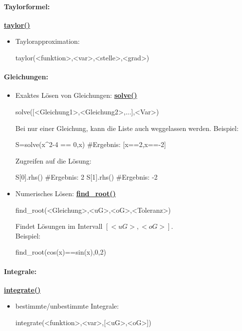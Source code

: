 \documentclass[a4paper,9pt,DIV15,twocolumn]{scrartcl}
\begin{document}
{\paragraph{Taylorformel:} \href{https://sage.math.uni-goettingen.de/doc/static/reference/sage/calculus/functional.html?highlight=diff#sage.calculus.functional.integral}{\textbf{taylor()}}
\begin{itemize}
 \item Taylorapproximation: 

\begin{sageinsmall}
taylor(<funktion>,<var>,<stelle>,<grad>)
\end{sageinsmall}
\end{itemize}
\paragraph{Gleichungen:}
\begin{itemize}
 \item Exaktes Lösen von Gleichungen: \href{https://sage.math.uni-goettingen.de/doc/static/reference/calculus/sage/symbolic/relation.html#sage.symbolic.relation.solve}{\textbf{solve()}}
  \begin{sageinsmall}
solve([<Gleichung1>,<Gleichung2>,...],<Var>)
\end{sageinsmall}
Bei nur einer Gleichung, kann die Liste auch weggelassen werden. Beispiel:
  \begin{sageinsmall}
S=solve(x^2-4 == 0,x) #Ergebnis: [x==2,x==-2]
\end{sageinsmall}
Zugreifen auf die Lösung:
  \begin{sageinsmall}
S[0].rhs() #Ergebnis: 2
S[1].rhs() #Ergebnis: -2
\end{sageinsmall}
\item Numerisches Lösen: \href{https://sage.math.uni-goettingen.de/doc/static/reference/numerical/sage/numerical/optimize.html#sage.numerical.optimize.find_root}{\textbf{find\_root()}}

   \begin{sageinsmall}
find_root(<Gleichung>,<uG>,<oG>,<Toleranz>)
\end{sageinsmall}
Findet Lösungen im Intervall  $[<uG>,<oG>]$.\\
Beispiel:
  \begin{sageinsmall}
find_root(cos(x)==sin(x),0,2)
\end{sageinsmall}
\end{itemize}

\paragraph{Integrale:} \href{https://sage.math.uni-goettingen.de/doc/static/reference/sage/calculus/functional.html?highlight=diff#sage.calculus.functional.integral}{\textbf{integrate()}}
\begin{itemize}
\item bestimmte/unbestimmte Integrale: 
\begin{sageinsmall}
integrate(<funktion>,<var>,[<uG>,<oG>]) 
\end{sageinsmall}
\end{itemize}

}
\end{document}

